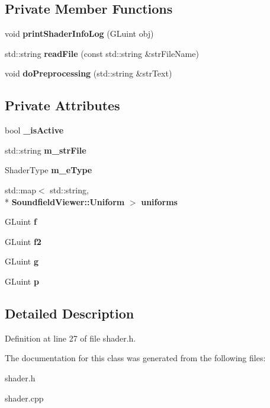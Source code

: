 \subsection*{Private Member Functions}
\begin{DoxyCompactItemize}
\item 
void {\bfseries print\-Shader\-Info\-Log} (G\-Luint obj)\label{classSoundfieldViewer_1_1Shader_a278d4f65949b9bb2a37bb09fdd3bb70a}

\item 
std\-::string {\bfseries read\-File} (const std\-::string \&str\-File\-Name)\label{classSoundfieldViewer_1_1Shader_a1e7d896e33ba2d56a2d55ee6163d2188}

\item 
void {\bfseries do\-Preprocessing} (std\-::string \&str\-Text)\label{classSoundfieldViewer_1_1Shader_a723eb067d9f0af807abf813465ca17fc}

\end{DoxyCompactItemize}
\subsection*{Private Attributes}
\begin{DoxyCompactItemize}
\item 
bool {\bfseries \-\_\-is\-Active}\label{classSoundfieldViewer_1_1Shader_a696f7917d34043a515a3ca49b98c7859}

\item 
std\-::string {\bfseries m\-\_\-str\-File}\label{classSoundfieldViewer_1_1Shader_af4e2e1c9c6f85bbeae54a98f90b22ea9}

\item 
Shader\-Type {\bfseries m\-\_\-e\-Type}\label{classSoundfieldViewer_1_1Shader_abb185cff42ba4f0352d6521a1187f9bd}

\item 
std\-::map$<$ std\-::string, \\*
{\bf Soundfield\-Viewer\-::\-Uniform} $>$ {\bfseries uniforms}\label{classSoundfieldViewer_1_1Shader_ab8d578b9b38cbde90558dbf9cb59472b}

\item 
G\-Luint {\bfseries f}\label{classSoundfieldViewer_1_1Shader_ac29c9f8d78dafd0a6c89c2ce1b121670}

\item 
G\-Luint {\bfseries f2}\label{classSoundfieldViewer_1_1Shader_a07aa5763e2b030fcb2c461627d6f0db6}

\item 
G\-Luint {\bfseries g}\label{classSoundfieldViewer_1_1Shader_a2d0312a1f05208a1729c2f3391151541}

\item 
G\-Luint {\bfseries p}\label{classSoundfieldViewer_1_1Shader_ad63698f73eb53602de3954d7739f615f}

\end{DoxyCompactItemize}


\subsection{Detailed Description}


Definition at line 27 of file shader.\-h.



The documentation for this class was generated from the following files\-:\begin{DoxyCompactItemize}
\item 
shader.\-h\item 
shader.\-cpp\end{DoxyCompactItemize}
